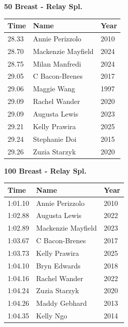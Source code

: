 \vspace{1.2em}
\noindent\begin{minipage}[t]{0.48\textwidth}
\centering
\textbf{\textcolor{teamprimary}{50 Breast - Relay Spl.}}\par
\vspace{0.5em}
\centering
\small
\renewcommand{\arraystretch}{1.0}
\setlength{\tabcolsep}{4pt}
\begin{tabular}{@{}p{1.8cm}p{3.0cm}p{1.0cm}@{}}
\toprule
\textbf{Time} & \textbf{Name} & \textbf{Year} \\
\midrule
28.33 & Annie Perizzolo & 2010 \\
28.70 & Mackenzie Mayfield & 2024 \\
28.75 & Milan Manfredi & 2024 \\
29.05 & C Bacon-Brenes & 2017 \\
29.06 & Maggie Wang & 1997 \\
29.09 & Rachel Wander & 2020 \\
29.09 & Augusta Lewis & 2023 \\
29.21 & Kelly Prawira & 2025 \\
29.24 & Stephanie Doi & 2015 \\
29.26 & Zuzia Starzyk & 2020 \\
\bottomrule
\end{tabular}
\end{minipage}
\hfill
\begin{minipage}[t]{0.48\textwidth}
\centering
\textbf{\textcolor{teamprimary}{100 Breast - Relay Spl.}}\par
\vspace{0.5em}
\centering
\small
\renewcommand{\arraystretch}{1.0}
\setlength{\tabcolsep}{4pt}
\begin{tabular}{@{}p{1.8cm}p{3.0cm}p{1.0cm}@{}}
\toprule
\textbf{Time} & \textbf{Name} & \textbf{Year} \\
\midrule
1:01.10 & Annie Perizzolo & 2010 \\
1:02.88 & Augusta Lewis & 2022 \\
1:02.89 & Mackenzie Mayfield & 2023 \\
1:03.67 & C Bacon-Brenes & 2017 \\
1:03.73 & Kelly Prawira & 2025 \\
1:04.10 & Bryn Edwards & 2018 \\
1:04.16 & Rachel Wander & 2022 \\
1:04.24 & Zuzia Starzyk & 2020 \\
1:04.26 & Maddy Gebhard & 2013 \\
1:04.35 & Kelly Ngo & 2014 \\
\bottomrule
\end{tabular}
\end{minipage}
